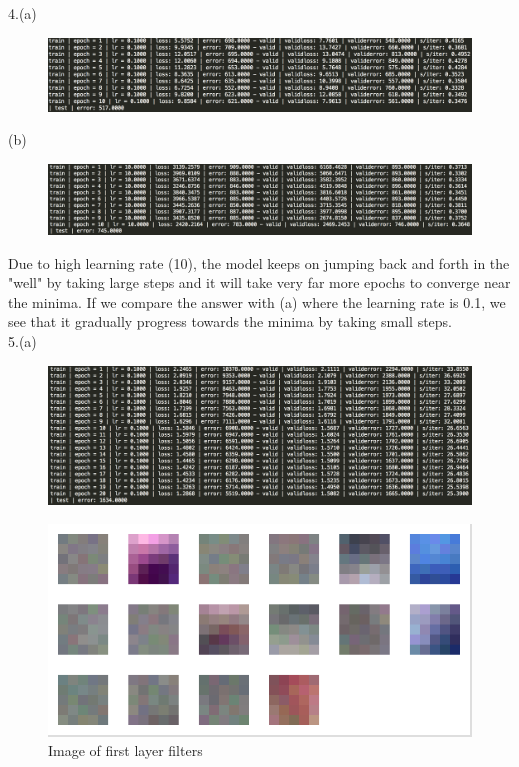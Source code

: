 \documentclass[11pt]{article}
\begin{document}
4.(a)
\begin{figure}[H]
\centering
\includegraphics[scale=0.5]{assign2/torch/outputLRpoint1.png}
\caption{ \label{fig5}}
\end{figure}

(b)
\begin{figure}[H]
\centering
\includegraphics[scale=0.5]{assign2/torch/outputLR10.png}
\caption{ \label{fig5}}
\end{figure}
Due to high learning rate (10), the model keeps on jumping back and forth in the "well" by taking large steps and it will take very far more epochs to converge near the minima. If we compare the answer with (a) where the learning rate is 0.1, we see that it gradually progress towards the minima by taking small steps.
\\
5.(a)
\begin{figure}[H]
\centering
\includegraphics[scale=0.5]{assign2/torch/outputCNN.png}
\caption{ \label{fig5}}
\end{figure}
 
\begin{figure}[H]
\centering
\includegraphics[scale=0.5]{assign2/torch/weightCNN.png}
\caption{Image of first layer filters \label{fig5}}
\end{figure}
\end{document}
